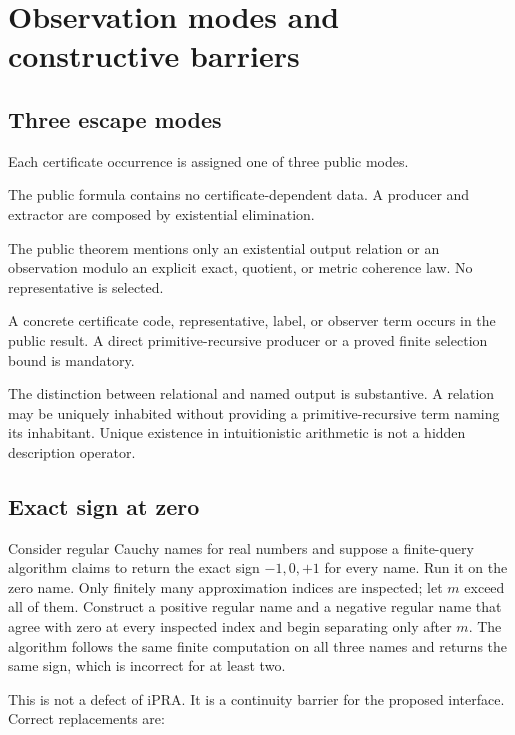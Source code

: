 \section{Observation modes and constructive barriers}
\label{sec:observations}

\subsection{Three escape modes}

Each certificate occurrence is assigned one of three public modes.

\begin{description}[leftmargin=2.9cm]
\item[Sealed.]  The public formula contains no certificate-dependent data.  A
  producer and extractor are composed by existential elimination.
\item[Relational.]  The public theorem mentions only an existential output
  relation or an observation modulo an explicit exact, quotient, or metric
  coherence law.  No representative is selected.
\item[Named.]  A concrete certificate code, representative, label, or observer
  term occurs in the public result.  A direct primitive-recursive producer or a
  proved finite selection bound is mandatory.
\end{description}

The distinction between relational and named output is substantive.  A
relation may be uniquely inhabited without providing a primitive-recursive
term naming its inhabitant.  Unique existence in intuitionistic arithmetic is
not a hidden description operator.

\subsection{Exact sign at zero}

Consider regular Cauchy names for real numbers and suppose a finite-query
algorithm claims to return the exact sign \(-1,0,+1\) for every name.  Run it
on the zero name.  Only finitely many approximation indices are inspected; let
\(m\) exceed all of them.  Construct a positive regular name and a negative
regular name that agree with zero at every inspected index and begin separating
only after \(m\).  The algorithm follows the same finite computation on all
three names and returns the same sign, which is incorrect for at least two.

This is not a defect of iPRA.  It is a continuity barrier for the proposed
interface.  Correct replacements are:

